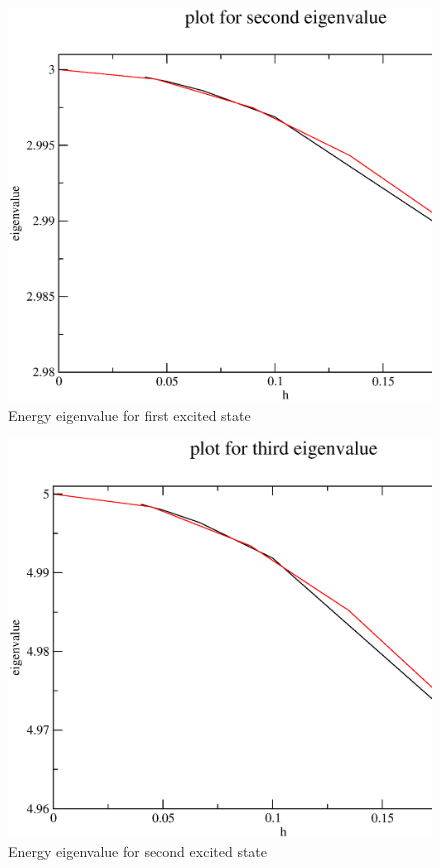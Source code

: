 \documentclass[11pt,a4paper,english]{article}
\begin{document}
	\begin{figure}[h!]
	\centering
	\includegraphics [scale=0.6]{e1.eps}
	\caption{Energy eigenvalue for first excited state }
	\end{figure}
	\clearpage
	
	\begin{figure}[h!]
	\centering
	\includegraphics [scale=0.6]{e2.eps}
	\caption{Energy eigenvalue for second excited state }
	\end{figure}
	\clearpage
    
\end{document}
